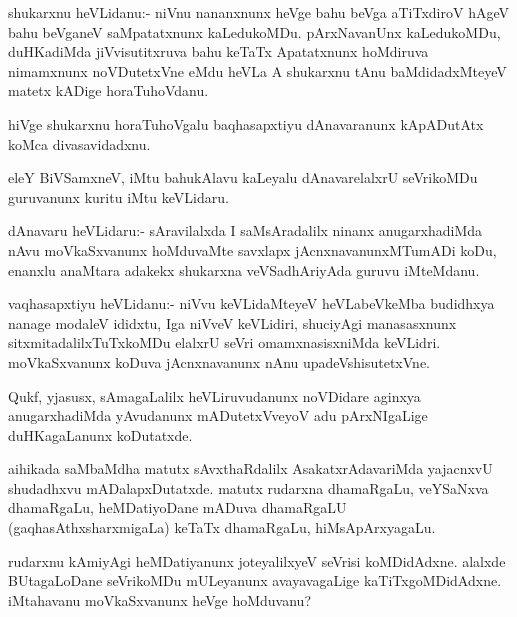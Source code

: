 \documentclass{article}
\begin{document}
\begin{mn}%
shukarxnu heVLidanu:- niVnu nananxnunx heVge bahu beVga aTiTxdiroV
hAgeV bahu beVganeV saMpatatxnunx kaLedukoMDu. pArxNavanUnx
kaLedukoMDu, duHKadiMda jiVvisutitxruva bahu keTaTx Apatatxnunx
hoMdiruva nimamxnunx noVDutetxVne eMdu heVLa A shukarxnu tAnu
baMdidadxMteyeV matetx kADige horaTuhoVdanu.
\end{mn}

\begin{mn}
hiVge shukarxnu horaTuhoVgalu baqhasapxtiyu dAnavaranunx kApADutAtx
koMca divasavidadxnu.
\end{mn}

\begin{mn}%
eleY BiVSamxneV, iMtu bahukAlavu kaLeyalu dAnavarelalxrU seVrikoMDu
guruvanunx kuritu iMtu keVLidaru.
\end{mn}

\begin{mn}%
dAnavaru heVLidaru:- sAravilalxda I saMsAradalilx ninanx
anugarxhadiMda nAvu moVkaSxvanunx hoMduvaMte savxlapx
jAcnxnavanunxMTumADi koDu, enanxlu anaMtara adakekx shukarxna
veVSadhAriyAda guruvu iMteMdanu.
\end{mn}

\begin{mn}
vaqhasapxtiyu heVLidanu:- niVvu keVLidaMteyeV heVLabeVkeMba budidhxya
nanage modaleV ididxtu, Iga niVveV keVLidiri, shuciyAgi manasasxnunx
sitxmitadalilxTuTxkoMDu elalxrU seVri omamxnasisxniMda
keVLidri. moVkaSxvanunx koDuva jAcnxnavanunx nAnu upadeVshisutetxVne.
\end{mn}

\begin{mn}%
Qukf, yjasusx, sAmagaLalilx heVLiruvudanunx noVDidare aginxya
anugarxhadiMda yAvudanunx mADutetxVveyoV adu pArxNIgaLige
duHKagaLanunx koDutatxde.
\end{mn}

\begin{mn}%
aihikada saMbaMdha matutx sAvxthaRdalilx AsakatxrAdavariMda yajacnxvU
shudadhxvu mADalapxDutatxde. matutx rudarxna dhamaRgaLu, veYSaNxva
dhamaRgaLu, heMDatiyoDane mADuva dhamaRgaLU (gaqhasAthxsharxmigaLa)
keTaTx dhamaRgaLu, hiMsApArxyagaLu.
\end{mn}

\begin{mn}%
rudarxnu kAmiyAgi heMDatiyanunx joteyalilxyeV seVrisi
koMDidAdxne. alalxde BUtagaLoDane seVrikoMDu mULeyanunx avayavagaLige
kaTiTxgoMDidAdxne. iMtahavanu moVkaSxvanunx heVge hoMduvanu?
\end{mn}
\end{document}
